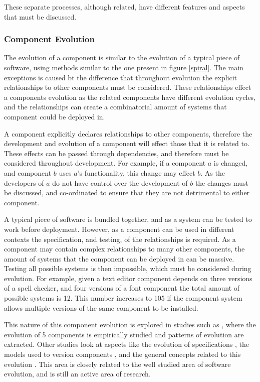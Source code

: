 These separate processes, although related, have different features and aspects that must be discussed.

\subsubsection{Component Evolution}
The evolution of a component is similar to the evolution of a typical piece of software, using methods similar to the one present in figure \ref{spiral}.
The main exceptions is caused bt the difference that throughout evolution the explicit relationships to other components must be considered.
These relationships effect a components evolution as the related components have different evolution cycles, 
and the relationships can create a combinatorial amount of systems that component could be deployed in.

A component explicitly declares relationships to other components, therefore the development and evolution of a component will effect those that it is related to.
These effects can be passed through dependencies, and therefore must be considered throughout development.
For example, if a component $a$ is changed, and component $b$ uses $a$'s functionality, this change may effect $b$.
As the developers of $a$ do not have control over the development of $b$ the changes must be discussed, and co-ordinated to ensure that they are not detrimental to either component.

A typical piece of software is bundled together, and as a system can be tested to work before deployment.
However, as a component can be used in different contexts the specification, and testing, of the relationships is required.
As a component may contain complex relationships to many other components,
the amount of systems that the component can be deployed in can be massive.
Testing all possible systems is then impossible, which must be considered during evolution.
For example, given a text editor component depends on three versions of a spell checker, 
and four versions of a font component the total amount of possible systems is 12.
This number increases to 105 if the component system allows multiple versions of the same component to be installed.

This nature of this component evolution is explored in studies such as \cite{vasa2007patterns}, where the evolution of 5 components is empirically studied and patterns of evolution are extracted.
Other studies look at aspects like the evolution of specifications \cite{Mencl2001}, the models used to version components \cite{Stuckenholz2005},
and the general concepts related to this evolution \cite{Rhode2000}.
This area is closely related to the well studied area of software evolution, and is still an active area of research.

